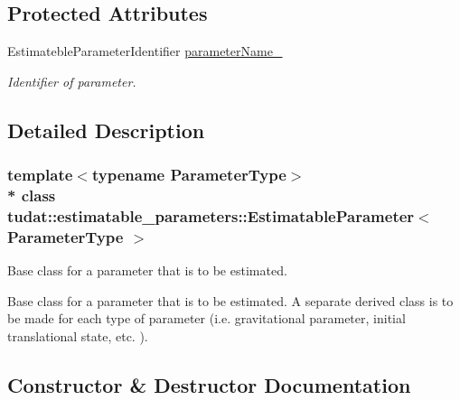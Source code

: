 \subsection*{Protected Attributes}
\begin{DoxyCompactItemize}
\item 
Estimateble\+Parameter\+Identifier \hyperlink{classtudat_1_1estimatable__parameters_1_1EstimatableParameter_a3d43d2db730c707b789768dad4de5ae6}{parameter\+Name\+\_\+}\hypertarget{classtudat_1_1estimatable__parameters_1_1EstimatableParameter_a3d43d2db730c707b789768dad4de5ae6}{}\label{classtudat_1_1estimatable__parameters_1_1EstimatableParameter_a3d43d2db730c707b789768dad4de5ae6}

\begin{DoxyCompactList}\small\item\em Identifier of parameter. \end{DoxyCompactList}\end{DoxyCompactItemize}


\subsection{Detailed Description}
\subsubsection*{template$<$typename Parameter\+Type$>$\\*
class tudat\+::estimatable\+\_\+parameters\+::\+Estimatable\+Parameter$<$ Parameter\+Type $>$}

Base class for a parameter that is to be estimated. 

Base class for a parameter that is to be estimated. A separate derived class is to be made for each type of parameter (i.\+e. gravitational parameter, initial translational state, etc. ). 

\subsection{Constructor \& Destructor Documentation}
